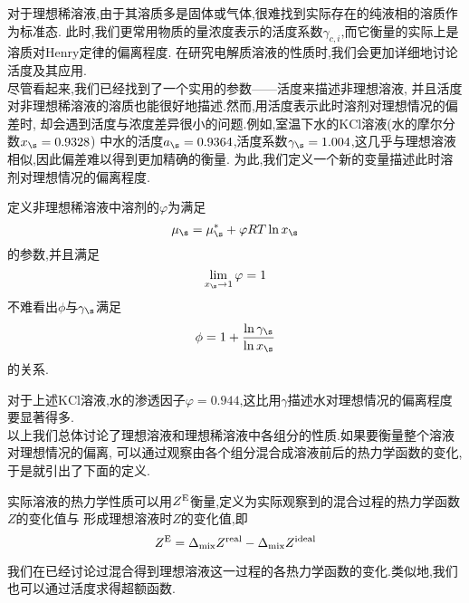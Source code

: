 \documentclass{ctexart}
\begin{document}
\indent 对于理想稀溶液,由于其溶质多是固体或气体,很难找到实际存在的纯液相的溶质作为标准态.%
此时,我们更常用物质的量浓度表示的活度系数$\gamma_{c,i}$,而它衡量的实际上是溶质对Henry定律的偏离程度.%
在研究电解质溶液的性质时,我们会更加详细地讨论活度及其应用.\vspace{4pt}\\
\indent 尽管看起来,我们已经找到了一个实用的参数——活度来描述非理想溶液,%
并且活度对非理想稀溶液的溶质也能很好地描述.然而,用活度表示此时溶剂对理想情况的偏差时,%
却会遇到活度与浓度差异很小的问题.例如,室温下水的$\text{KCl}$溶液(水的摩尔分数$x_\s=0.9328$)%
中水的活度$a_\s=0.9364$,活度系数$\gamma_\s=1.004$,这几乎与理想溶液相似,因此偏差难以得到更加精确的衡量.%
为此,我们定义一个新的变量描述此时溶剂对理想情况的偏离程度.
\begin{definition}[4C.6.3 渗透因子]
    定义非理想稀溶液中溶剂的$\varphi$为满足
    \[\mu_\s=\mu_{\s}^\ast+\varphi RT\ln x_\s\]
    的参数,并且满足
    \[\lim_{x_\s\to1}\varphi=1\]
    不难看出$\phi$与$\gamma_\s$满足
    \[\phi=1+\dfrac{\ln\gamma_\s}{\ln x_\s}\]
    的关系.
\end{definition}
对于上述$\text{KCl}$溶液,水的渗透因子$\varphi=0.944$,这比用$\gamma$描述水对理想情况的偏离程度要显著得多.\vspace{4pt}\\
\indent 以上我们总体讨论了理想溶液和理想稀溶液中各组分的性质.如果要衡量整个溶液对理想情况的偏离,%
可以通过观察由各个组分混合成溶液前后的热力学函数的变化,于是就引出了下面的定义.
\begin{definition}[4C.6.4 超额函数]
    实际溶液的热力学性质可以用$Z^\text E$衡量,定义为实际观察到的混合过程的热力学函数$Z$的变化值与%
    形成理想溶液时$Z$的变化值,即
    \[Z^\text E=\Delta_{\text{mix}}Z^{\text{real}}-\Delta_{\text{mix}}Z^{\text{ideal}}\]

\end{definition}
我们在已经讨论过混合得到理想溶液这一过程的各热力学函数的变化.类似地,我们也可以通过活度求得超额函数.
\end{document}
